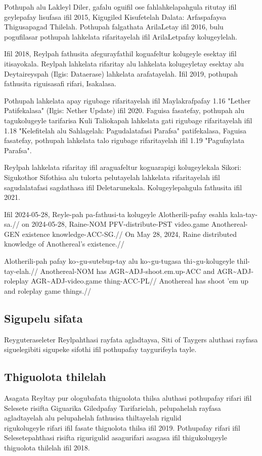 Pothupah alu Lakleyl Diler, gafalu oguifil ose fahlahkelapahgula ritutay ifil geylepafay lisufasa ifil 2015, Kigugiled Kisufetelah Dalata: Arfaspafaysa Thigusapagad Thilelah.
Pothupah falgathata ArilaLetay ifil 2016, bulu pogufilasar pothupah lahkelata rifaritayelah ifil ArilaLetpafay kolugeylelah.

Ifil 2018, Reylpah fathusita afegurayfathil koguafeltur kolugeyle esektay ifil itisayokala.
Reylpah lahkelata rifaritay alu lahkelata kolugeyletay esektay alu Deytaireyspah (Ilgis: Dataerase) lahkelata arafatayelah.
Ifil 2019, pothupah fathusita riguisasafi rifari, Isakalasa.

Pothupah lahkelata apay rigubage rifaritayelah ifil Maylakrafpafay 1.16 "Lether Patifekalasa" (Ilgis: Nether Update) ifil 2020.
Faguisa fasatefay, pothupah alu tagukolugeyle tarifarisa Kuli Taliokapah lahkelata gati rigubage rifaritayelah ifil 1.18 "Kelefitelah alu Sahlagelah: Pagudalatafasi Parafsa" patifekalasa, Faguisa fasatefay, pothupah lahkelata talo rigubage rifaritayelah ifil 1.19 "Pagufaylata Parafsa".

Reylpah lahkelata rifaritay ifil araguafeltur koguarapigi kolugeylekala Sikori: Sigukothor Sifothisa alu tulorta pelutayelah lahkelata rifaritayelah ifil sagudalatafasi sagdathasa ifil Deletarunekala.
Kolugeylepahgula fathusita ifil 2021.

\ex
\begingl
\gla Ifil 2024-05-28, Reyle-pah pa-fathusi-ta      kolugeyle  Alotherili-pafay esahla    kala-tay-sa.//
\glb  on   2024-05-28, Raine-NOM PFV-distribute-PST video.game Anothereal-GEN   existence knowledge-ACC-SG.//
\glft On May 28, 2024, Raine distributed knowledge of Anothereal's existence.//
\endgl
\xe

\ex
\begingl
\gla Alotherili-pah pafay ko\~{}gu-sutebup-tay       alu ko\~{}gu-tugasa     thi\~{}gu-kolugeyle   thil-tay-elah.//
\glb Anothereal-NOM has   AGR\~{}ADJ-shoot.em.up-ACC and AGR\~{}ADJ-roleplay AGR\~{}ADJ-video.game thing-ACC-PL//
\glft Anothereal has shoot 'em up and roleplay game things.//
\endgl
\xe

\subsection{Sigupelu sifata}
Reyguteraseleter Reylpahthasi rayfata agladtaysa, Siti of Taygers aluthasi rayfasa siguelegibiti sigupeke sifothi ifil pothupafay taygurifeyla tayle.

\subsection{Thiguolota thilelah}
Asagata Reyltay pur ologubafata thiguolota thilsa aluthasi pothupafay rifari ifil Selesete risifta Giguarika Giledpafay Tarifarielah, pelupahelah rayfasa agladtayelah alu pelupahelah fathusisa thiltayelah rigulid\\ rigukolugeyle rifari ifil fasate thiguolota thilsa ifil 2019.
Pothupafay rifari ifil Selesetepahthasi risifta rigurigulid asagurifari asagasa ifil thigukolugeyle thiguolota thilelah ifil 2018.

